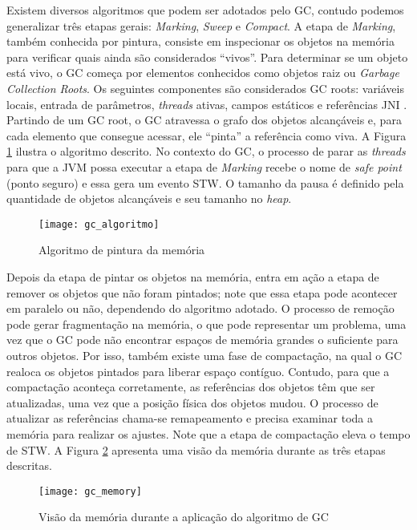 Existem diversos algoritmos que podem ser adotados pelo GC, contudo podemos
generalizar três etapas gerais: \emph{Marking}, \emph{Sweep} e
\emph{Compact}. A etapa de \emph{Marking}, também conhecida por pintura,
consiste em inspecionar os objetos na memória para verificar quais ainda são
considerados ``vivos''. Para determinar se um objeto está vivo, o GC começa por
elementos conhecidos como objetos raiz ou \emph{Garbage Collection Roots}. Os
seguintes componentes são considerados GC roots: variáveis locais,
entrada de parâmetros, \emph{threads} ativas, campos estáticos e referências JNI
\citep{gc_basics}. Partindo de um GC root, o GC atravessa o grafo dos objetos
alcançáveis e, para cada elemento que consegue acessar, ele ``pinta'' a referência
como viva. A Figura \ref{fig:gc_alg} ilustra o algoritmo descrito. No contexto
do GC, o processo de parar as \emph{threads} para que a JVM possa executar a etapa de
\emph{Marking} recebe o nome de \emph{safe point} (ponto seguro) e essa
gera um evento STW. O tamanho da pausa é definido pela quantidade de objetos
alcançáveis e seu tamanho no \emph{heap}.

\begin{figure}[!h]
  \centering
  \texttt{[image: gc\_algoritmo]}
	\caption[Algoritmo de pintura da memória]{Algoritmo de pintura da memória\citep{gc_basics}}
  \label{fig:gc_alg}
\end{figure}

Depois da etapa de pintar os objetos na memória, entra em ação a etapa de
remover os objetos que não foram pintados; note que essa etapa pode acontecer
em paralelo ou não, dependendo do algoritmo adotado. O processo de remoção pode
gerar fragmentação na memória, o que pode representar um problema, uma vez que o
GC pode não encontrar espaços de memória grandes o suficiente para outros
objetos. Por isso, também existe uma fase de compactação, na qual o GC realoca os
objetos pintados para liberar espaço contíguo. Contudo, para que a compactação
aconteça corretamente, as referências dos objetos têm que ser atualizadas, uma
vez que a posição física dos objetos mudou. O processo de atualizar as
referências chama-se remapeamento e precisa examinar toda a memória para
realizar os ajustes. Note que a etapa de compactação eleva o tempo de STW. A
Figura \ref{fig:gc_mem} apresenta uma visão da memória durante as três etapas
descritas.

\begin{figure}[!h]
  \centering
  \texttt{[image: gc\_memory]}
	\caption[Visão da memória durante a aplicação do algoritmo de GC]{Visão da memória durante a aplicação do algoritmo de GC\citep{gc_basics}}
  \label{fig:gc_mem}
\end{figure}

